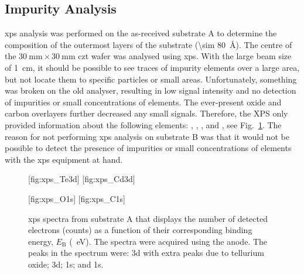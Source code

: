 
\subsection{Impurity Analysis}

\Ac{xps} analysis was performed on the as-received substrate A to determine the composition of the outermost layers of the substrate (\SI{\sim 80}{\angstrom}). The centre of the $\SI{30}{\milli\metre}\times\SI{30}{\milli\metre}$ \ac{czt} wafer was analysed using \ac{xps}. With the large beam size of \SI{1}{\centi\metre}, it should be possible to see traces of impurity elements over a large area, but not locate them to specific particles or small areas. Unfortunately, something was broken on the old analyser, resulting in low signal intensity and no detection of impurities or small concentrations of elements. The ever-present oxide and carbon overlayers further decreased any small signals. Therefore, the XPS only provided information about the following elements: , , , and , see Fig.~\ref{fig:xps_spectra}. The reason for not performing \ac{xps} analysis on substrate B was that it would not be possible to detect the presence of impurities or small concentrations of elements with the \ac{xps} equipment at hand.

\begin{figure}[htbp]
    \centering
    [fig:xps_Te3d]
    \hfill
    [fig:xps_Cd3d]
    \par\bigskip
    [fig:xps_O1s]
    \hfill
    [fig:xps_C1s]
    \caption[\Ac{xps} spectra from substrate A.]{\Ac{xps} spectra from substrate A that displays the number of detected electrons (counts) as a function of their corresponding binding energy, $E_\mathrm{B}$ (\SI{}{\electronvolt}). The spectra were acquired using the  anode. The peaks in the spectrum were:   3d with extra peaks due to tellurium oxide;   3d;   1s; and   1s.}
    \label{fig:xps_spectra}
\end{figure}
 
